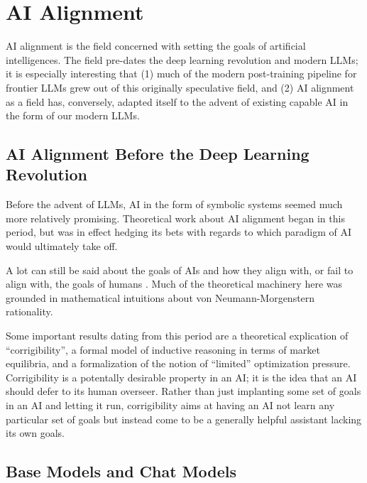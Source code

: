 \chapter{AI Alignment}\label{ch_ai_alignment}

AI alignment is the field concerned with setting the goals of artificial
intelligences. The field pre-dates the deep learning revolution and modern
LLMs; it is especially interesting that (1) much of the modern post-training
pipeline for frontier LLMs grew out of this originally speculative field, and
(2) AI alignment as a field has, conversely, adapted itself to the advent of
existing capable AI in the form of our modern LLMs.

\section{AI Alignment Before the Deep Learning Revolution}
Before the advent of LLMs, AI in the form of symbolic systems seemed much more
relatively promising. Theoretical work about AI alignment began in this period,
but was in effect hedging its bets with regards to which paradigm of AI would
ultimately take off.

A lot can still be said about the goals of AIs and how they align with, or fail
to align with, the goals of humans \cite{bostrom2014superintelligence}. Much of
the theoretical machinery here was grounded in mathematical intuitions about
von Neumann-Morgenstern rationality.

Some important results dating from this period are a theoretical explication of
``corrigibility'', a formal model of inductive reasoning in terms of market
equilibria, and a formalization of the notion of ``limited'' optimization
pressure. Corrigibility is a potentally desirable property in an AI; it is the
idea that an AI should defer to its human overseer. Rather than just implanting
some set of goals in an AI and letting it run, corrigibility aims at having an
AI not learn any particular set of goals but instead come to be a generally
helpful assistant lacking its own goals.

\section{Base Models and Chat Models}

